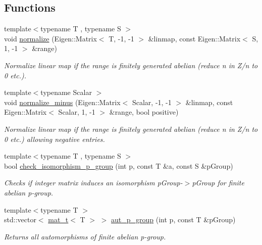 \subsection*{Functions}
\begin{DoxyCompactItemize}
\item 
{\footnotesize template$<$typename T , typename S $>$ }\\void \hyperlink{namespaceMackey_a5ae32d04bca298d2d8735635ae45b971}{normalize} (Eigen\+::\+Matrix$<$ T, -\/1, -\/1 $>$ \&linmap, const Eigen\+::\+Matrix$<$ S, 1, -\/1 $>$ \&range)
\begin{DoxyCompactList}\small\item\em Normalize linear map if the range is finitely generated abelian (reduce n in Z/n to 0 etc.). \end{DoxyCompactList}\item 
{\footnotesize template$<$typename Scalar $>$ }\\void \hyperlink{namespaceMackey_a463bb762b4edc2f283e8d1c0c466aedf}{normalize\+\_\+minus} (Eigen\+::\+Matrix$<$ Scalar, -\/1, -\/1 $>$ \&linmap, const Eigen\+::\+Matrix$<$ Scalar, 1, -\/1 $>$ \&range, bool positive)
\begin{DoxyCompactList}\small\item\em Normalize linear map if the range is finitely generated abelian (reduce n in Z/n to 0 etc.) allowing negative entries. \end{DoxyCompactList}\item 
{\footnotesize template$<$typename T , typename S $>$ }\\bool \hyperlink{namespaceMackey_aa96cf972d89b207ce6709e867f760f37}{check\+\_\+isomorphism\+\_\+p\+\_\+group} (int p, const T \&a, const S \&p\+Group)
\begin{DoxyCompactList}\small\item\em Checks if integer matrix induces an isomorphism p\+Group-\/$>$p\+Group for finite abelian p-\/group. \end{DoxyCompactList}\item 
{\footnotesize template$<$typename T $>$ }\\std\+::vector$<$ \hyperlink{namespaceMackey_a035386035757dade630f685e508e5cf9}{mat\+\_\+t}$<$ T $>$ $>$ \hyperlink{namespaceMackey_a918f02198f6daadfd0c93109b63b2f1f}{aut\+\_\+p\+\_\+group} (int p, const T \&p\+Group)
\begin{DoxyCompactList}\small\item\em Returns all automorphisms of finite abelian p-\/group. \end{DoxyCompactList}\item 

\end{DoxyCompactItemize}
